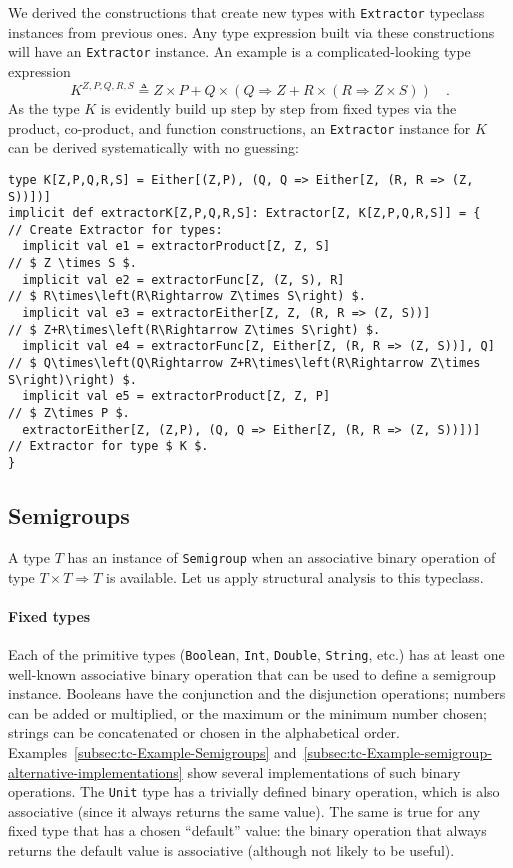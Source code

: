 We derived the constructions that create new types with \lstinline!Extractor!
typeclass instances from previous ones. Any type expression built
via these constructions will have an \lstinline!Extractor! instance.
An example is a complicated-looking type expression
\[
K^{Z,P,Q,R,S}\triangleq Z\times P+Q\times\left(Q\Rightarrow Z+R\times\left(R\Rightarrow Z\times S\right)\right)\quad.
\]
As the type $K$ is evidently build up step by step from fixed types
via the product, co-product, and function constructions, an \lstinline!Extractor!
instance for $K$ can be derived systematically with no guessing:
\begin{lstlisting}[mathescape=true]
type K[Z,P,Q,R,S] = Either[(Z,P), (Q, Q => Either[Z, (R, R => (Z, S))])]
implicit def extractorK[Z,P,Q,R,S]: Extractor[Z, K[Z,P,Q,R,S]] = {    // Create Extractor for types:
  implicit val e1 = extractorProduct[Z, Z, S]                         // $ Z \times S $.
  implicit val e2 = extractorFunc[Z, (Z, S), R]                       // $ R\times\left(R\Rightarrow Z\times S\right) $.
  implicit val e3 = extractorEither[Z, Z, (R, R => (Z, S))]           // $ Z+R\times\left(R\Rightarrow Z\times S\right) $.
  implicit val e4 = extractorFunc[Z, Either[Z, (R, R => (Z, S))], Q]  // $ Q\times\left(Q\Rightarrow Z+R\times\left(R\Rightarrow Z\times S\right)\right) $.
  implicit val e5 = extractorProduct[Z, Z, P]                         // $ Z\times P $.
  extractorEither[Z, (Z,P), (Q, Q => Either[Z, (R, R => (Z, S))])]    // Extractor for type $ K $.
}
\end{lstlisting}


\subsection{Semigroups\label{subsec:Semigroups-constructions}}

A type $T$ has an instance of \lstinline!Semigroup! when an associative
binary operation of type $T\times T\Rightarrow T$ is available. Let
us apply structural analysis to this typeclass.

\paragraph{Fixed types}

Each of the primitive types (\lstinline!Boolean!, \lstinline!Int!,
\lstinline!Double!, \lstinline!String!, etc.) has at least one well-known
associative binary operation that can be used to define a semigroup
instance. Booleans have the conjunction and the disjunction operations;
numbers can be added or multiplied, or the maximum or the minimum
number chosen; strings can be concatenated or chosen in the alphabetical
order. Examples~\ref{subsec:tc-Example-Semigroups} and~\ref{subsec:tc-Example-semigroup-alternative-implementations}
show several implementations of such binary operations. The \lstinline!Unit!
type has a trivially defined binary operation, which is also associative
(since it always returns the same value). The same is true for any
fixed type that has a chosen ``default'' value: the binary operation
that always returns the default value is associative (although not
likely to be useful).

